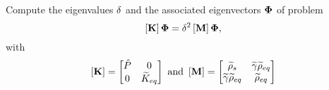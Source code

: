 \bexo
Compute the eigenvalues $\mathcal{\delta}$ and the associated eigenvectors $\boldsymbol{\Phi}$ of problem
\begin{equation}
	\left[ \textbf{K} \right]\boldsymbol{\Phi}=\delta^2 \left[ \textbf{M} \right]\boldsymbol{\Phi},
\end{equation}
with 
\begin{equation}
	\left[ \textbf{K} \right]=\begin{bmatrix}
		\hat{P} & 0\\ 0 & \widetilde{K}_{eq}
	\end{bmatrix} \textrm{ and } 
	\left[ \textbf{M} \right]=\begin{bmatrix}
		\widetilde{\rho}_s & \widetilde{\gamma}\widetilde{\rho}_{eq}\\
		\widetilde{\gamma}\widetilde{\rho}_{eq} & \widetilde{\rho}_{eq}
	\end{bmatrix}	
\end{equation}


\eexo
\solution{
}





